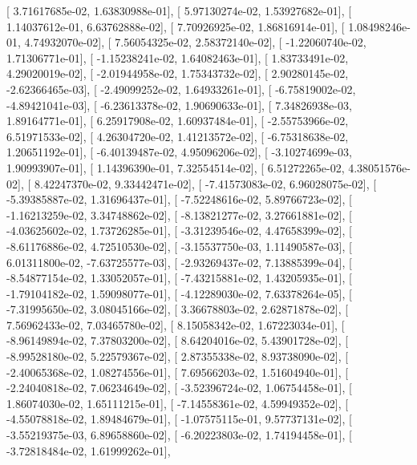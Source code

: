 \documentclass{article}
\begin{document}
       [  3.71617685e-02,   1.63830988e-01],
       [  5.97130274e-02,   1.53927682e-01],
       [  1.14037612e-01,   6.63762888e-02],
       [  7.70926925e-02,   1.86816914e-01],
       [  1.08498246e-01,   4.74932070e-02],
       [  7.56054325e-02,   2.58372140e-02],
       [ -1.22060740e-02,   1.71306771e-01],
       [ -1.15238241e-02,   1.64082463e-01],
       [  1.83733491e-02,   4.29020019e-02],
       [ -2.01944958e-02,   1.75343732e-02],
       [  2.90280145e-02,  -2.62366465e-03],
       [ -2.49099252e-02,   1.64933261e-01],
       [ -6.75819002e-02,  -4.89421041e-03],
       [ -6.23613378e-02,   1.90690633e-01],
       [  7.34826938e-03,   1.89164771e-01],
       [  6.25917908e-02,   1.60937484e-01],
       [ -2.55753966e-02,   6.51971533e-02],
       [  4.26304720e-02,   1.41213572e-02],
       [ -6.75318638e-02,   1.20651192e-01],
       [ -6.40139487e-02,   4.95096206e-02],
       [ -3.10274699e-03,   1.90993907e-01],
       [  1.14396390e-01,   7.32554514e-02],
       [  6.51272265e-02,   4.38051576e-02],
       [  8.42247370e-02,   9.33442471e-02],
       [ -7.41573083e-02,   6.96028075e-02],
       [ -5.39385887e-02,   1.31696437e-01],
       [ -7.52248616e-02,   5.89766723e-02],
       [ -1.16213259e-02,   3.34748862e-02],
       [ -8.13821277e-02,   3.27661881e-02],
       [ -4.03625602e-02,   1.73726285e-01],
       [ -3.31239546e-02,   4.47658399e-02],
       [ -8.61176886e-02,   4.72510530e-02],
       [ -3.15537750e-03,   1.11490587e-03],
       [  6.01311800e-02,  -7.63725577e-03],
       [ -2.93269437e-02,   7.13885399e-04],
       [ -8.54877154e-02,   1.33052057e-01],
       [ -7.43215881e-02,   1.43205935e-01],
       [ -1.79104182e-02,   1.59098077e-01],
       [ -4.12289030e-02,   7.63378264e-05],
       [ -7.31995650e-02,   3.08045166e-02],
       [  3.36678803e-02,   2.62871878e-02],
       [  7.56962433e-02,   7.03465780e-02],
       [  8.15058342e-02,   1.67223034e-01],
       [ -8.96149894e-02,   7.37803200e-02],
       [  8.64204016e-02,   5.43901728e-02],
       [ -8.99528180e-02,   5.22579367e-02],
       [  2.87355338e-02,   8.93738090e-02],
       [ -2.40065368e-02,   1.08274556e-01],
       [  7.69566203e-02,   1.51604940e-01],
       [ -2.24040818e-02,   7.06234649e-02],
       [ -3.52396724e-02,   1.06754458e-01],
       [  1.86074030e-02,   1.65111215e-01],
       [ -7.14558361e-02,   4.59949352e-02],
       [ -4.55078818e-02,   1.89484679e-01],
       [ -1.07575115e-01,   9.57737131e-02],
       [ -3.55219375e-03,   6.89658860e-02],
       [ -6.20223803e-02,   1.74194458e-01],
       [ -3.72818484e-02,   1.61999262e-01],
\end{document}
